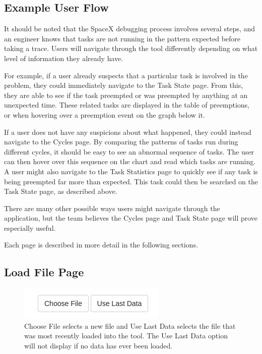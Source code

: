\documentclass{hmcclinic}
\begin{document}
\subsection{Example User Flow}
  It should be noted that the SpaceX debugging process involves several steps,
  and an engineer knows that tasks are not running in the
  pattern expected before taking a trace. Users will navigate through the tool
  differently depending on what level of information they already have.

  For example, if a user already suspects that a particular task is involved
  in the problem, they could immediately navigate to the Task State page. From
  this, they are able to see if the task preempted or was preempted by anything
  at an unexpected time. These related tasks are displayed in the table of
  preemptions, or when hovering over a preemption event on the graph below it.

  If a user does not have any suspicions about what happened, they could instead
  navigate to the Cycles page. By comparing the patterns of tasks run during
  different cycles, it should be easy to see an abnormal sequence of tasks. The
  user can then hover over this sequence on the chart and read which tasks are
  running. A user might also navigate to the Task Statistics page to quickly see
  if any task is being preempted far more than expected. This task could then be
  searched on the Task State page, as described above.

  There are many other possible ways users might navigate through the
  application, but the team believes the Cycles page and Task State page will
  prove especially useful.

  Each page is described in more detail in the following sections.

\subsection{Load File Page}

\begin{figure}[H]
  \centering
      \includegraphics[scale=0.75]{loadFile-buttons.png}
  \caption{Choose File selects a new file and Use Last Data selects the file
  that was most recently loaded into the tool. The Use Last Data option will not
display if no data has ever been loaded.}
  \end{figure}
\end{document}

